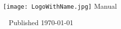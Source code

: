 \documentclass[11pt,fleqn]{book} %
\newcommand{\ProjectTitle}{isySUR}
\begin{document}

\begingroup
\thispagestyle{empty}
\centering
\vspace*{6cm}
\par\normalfont\fontsize{35}{35}\sffamily\selectfont
\texttt{[image: LogoWithName.jpg]}
\vspace*{1cm}
{\Huge Manual}\par
\endgroup


\newpage
~\vfill
\thispagestyle{empty}
Published \today






\end{document}
